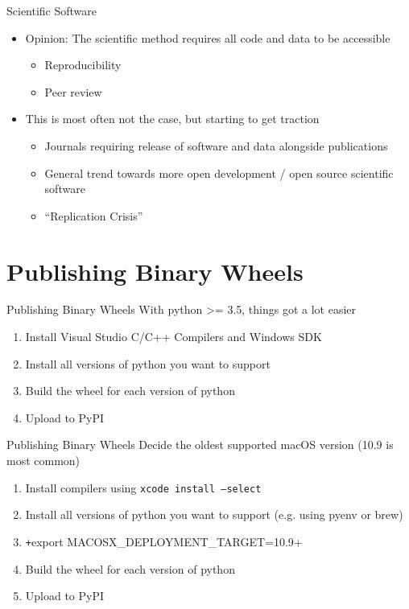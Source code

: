 \begin{frame}[c]{Scientific Software}
  \begin{itemize}
    \item Opinion: The scientific method requires all code and data to be accessible
      \begin{itemize}
        \item Reproducibility
        \item Peer review
      \end{itemize}
    \item This is most often not the case, but starting to get traction
      \begin{itemize}
        \item Journals requiring release of software and data alongside publications
        \item General trend towards more open development / open source scientific software
        \item \enquote{Replication Crisis}
      \end{itemize}
  \end{itemize}
\end{frame}

\section{Publishing Binary Wheels}
\begin{frame}[c]{Publishing Binary Wheels}
  With python >= 3.5, things got a lot easier
  \begin{enumerate}
    \item Install Visual Studio C/C++ Compilers and Windows SDK
    \item Install all versions of python you want to support
    \item Build the wheel for each version of python
    \item Upload to PyPI
  \end{enumerate}
\end{frame}


\begin{frame}[c]{Publishing Binary Wheels}
  Decide the oldest supported macOS version (10.9 is most common)

  \begin{enumerate}
    \item Install compilers using \texttt{xcode install --select}
    \item Install all versions of python you want to support (e.g. using pyenv or brew)
    \item \texttt+export MACOSX_DEPLOYMENT_TARGET=10.9+
    \item Build the wheel for each version of python
    \item Upload to PyPI
  \end{enumerate}
\end{frame}

